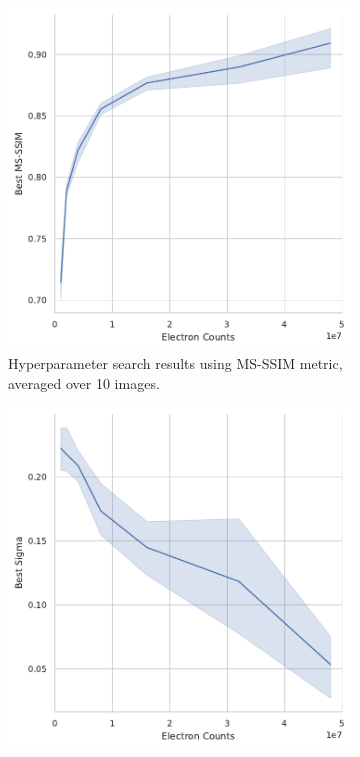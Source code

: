\begin{figure}[h]
    \centering
    \begin{subfigure}[t]{0.49\linewidth}
        \centering
        \includegraphics[width=\linewidth]{images/hyperparameter_msssim_averaged_10_images.pdf}
        \caption{Hyperparameter search results using MS-SSIM metric, averaged over 10 images.}
        \label{fig:hyperparameter-msssim-averaged-10-images}
    \end{subfigure}
    \hfill
    \begin{subfigure}[t]{0.49\linewidth}
        \centering
        \includegraphics[width=\linewidth]{images/hyperparameter_sigma_averaged_10_images.pdf}

\end{subfigure}
\end{figure}
